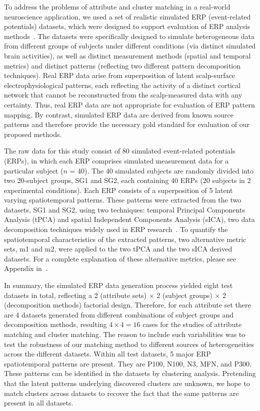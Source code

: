 To address the problems of attribute and cluster matching in a real-world neuroscience application, we used a set of realistic simulated ERP (event-related potentials) datasets, which were designed to support evaluation of ERP analysis methods~\cite{FrishkoffEtal07}. The datasets were specifically designed to simulate heterogeneous data from different groups of subjects under different conditions (via distinct simulated brain activities), as well as distinct measurement methods (spatial and temporal metrics) and distinct patterns (reflecting two different pattern decomposition techniques). Real ERP data arise from superposition of latent scalp-surface electrophysiological patterns, each reflecting the activity of a distinct cortical network that cannot be reconstructed from the scalp-measured data with any certainty. Thus, real ERP data are not appropriate for evaluation of ERP pattern mapping. By contrast, simulated ERP data are derived from known source patterns and therefore provide the necessary gold standard for evaluation of our proposed methods.

The raw data for this study consist of 80 simulated event-related potentials (ERPs), in which each ERP comprises simulated measurement data for a particular subject ($n$ = 40). The 40 simulated subjects are randomly divided into two 20-subject groups, SG1 and SG2, each containing 40 ERPs (20 subjects in 2 experimental conditions). Each ERP consists of a superposition of 5 latent varying spatiotemporal patterns. These patterns were extracted from the two datasets, SG1 and SG2, using two techniques: temporal Principal Components Analysis (tPCA) and spatial Independent Components Analysis (sICA), two data decomposition techniques widely used in ERP research~\cite{Dien2010}. To quantify the spatiotemporal characteristics of the extracted patterns, two alternative metric sets, m1 and m2, were applied to the two tPCA and the two sICA derived datasets. For a complete explanation of these alternative metrics, please see Appendix in~\cite{FrishkoffEtal07}.

In summary, the simulated ERP data generation process yielded eight test datasets in total, reflecting a 2 (attribute sets) $\times$ 2 (subject groups) $\times$ 2 (decomposition methods) factorial design. Therefore, for each attribute set there are 4 datasets generated from different combinations of subject groups and decomposition methods, resulting $4 \times 4 = 16$ cases for the studies of attribute matching and cluster matching. The reason to include such variabilities was to test the robustness of our matching method to different sources of heterogeneities across the different datasets. Within all test datasets, 5 major ERP spatiotemporal patterns are present. They are P100, N100, N3, MFN, and P300. These patterns can be identified in the datasets by clustering analysis. Pretending that the latent patterns underlying discovered clusters are unknown, we hope to match clusters across datasets to recover the fact that the same patterns are present in all datasets.

